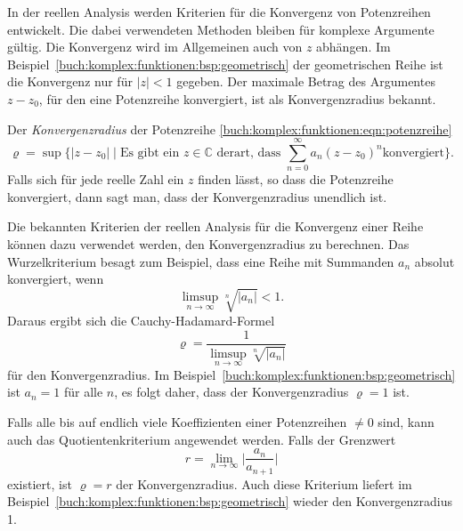 In der reellen Analysis werden Kriterien für die Konvergenz von
Potenzreihen entwickelt.
Die dabei verwendeten Methoden bleiben für komplexe Argumente gültig.
Die Konvergenz wird im Allgemeinen auch von $z$ abhängen.
Im Beispiel~\ref{buch:komplex:funktionen:bsp:geometrisch} der
geometrischen Reihe ist die Konvergenz nur für $|z|<1$ gegeben.
Der maximale Betrag des Argumentes $z-z_0$, für den eine Potenzreihe
konvergiert, ist als Konvergenzradius bekannt.

\begin{definition}[Konvergenzradius]
%
Der \emph{Konvergenzradius} der Potenzreihe
\eqref{buch:komplex:funktionen:eqn:potenzreihe}
\[
\varrho
=
\sup
\biggl\{
|z-z_0|
\;
\bigg|
\;
\text{Es gibt ein $z\in\mathbb{C}$ derart, dass $\displaystyle
\sum_{n=0}^\infty a_n(z-z_0)^n$
konvergiert}
\biggr\}.
\]
Falls sich für jede reelle Zahl ein $z$ finden lässt, so dass die
Potenzreihe konvergiert, dann sagt man, dass der Konvergenzradius
unendlich ist.
\end{definition}

Die bekannten Kriterien der reellen Analysis für die Konvergenz
einer Reihe können dazu verwendet werden, den Konvergenzradius
zu berechnen.
Das Wurzelkriterium besagt zum Beispiel, dass eine Reihe mit
Summanden $a_n$ absolut konvergiert, wenn 
\[
\limsup_{n\to\infty} \!\sqrt[n]{|a_n|} < 1.
\]
Daraus ergibt sich die Cauchy-Hadamard-Formel
\begin{equation}
\varrho
=
\frac{1}{\displaystyle\limsup_{n\to\infty}\!\sqrt[n]{|a_n|}}
\label{buch:komplex:funktionen:eqn:cauchy-hadamard}
\end{equation}
für den Konvergenzradius.
Im Beispiel~\ref{buch:komplex:funktionen:bsp:geometrisch}
ist $a_n=1$ für alle $n$, es folgt daher, dass der
Konvergenzradius $\varrho=1$ ist.

Falls alle bis auf endlich viele Koeffizienten einer Potenzreihen $\ne 0$
sind, kann auch das Quotientenkriterium angewendet werden.
Falls der Grenzwert
\[
r
=
\lim_{n\to\infty}
\biggl|
\frac{a_n}{a_{n+1}}
\biggr|
\]
existiert, ist $\varrho=r$ der Konvergenzradius.
Auch diese Kriterium liefert im 
Beispiel~\ref{buch:komplex:funktionen:bsp:geometrisch}
wieder den Konvergenzradius 1.

